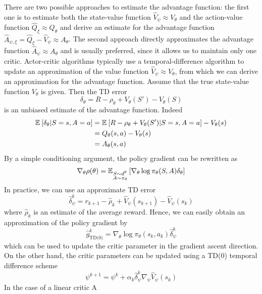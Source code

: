 There are two possible approaches to estimate the advantage function: the first one is to estimate both the state-value function $\widehat{V}_\psi \approx V_\theta$ and the action-value function $\widehat{Q}_\xi \approx Q_\theta$ and derive an estimate for the advantage function $\widehat{A}_{\psi, \xi} = \widehat{Q}_\xi - \widehat{V}_\psi \approx A_\theta$. The second approach directly approximates the advantage function $\widehat{A}_\psi \approx A_\theta$ and is usually preferred, since it allows us to maintain only one critic. Actor-critic algorithms typically use a temporal-difference algorithm to update an approximation of the value function $\widehat{V}_\psi \approx V_\theta$, from which we can derive an approximation for the advantage function. Assume that the true state-value function $V_\theta$ is given. Then the TD error 
\begin{equation}
	\delta_\theta = R - \rho_\theta + V_\theta(S') - V_\theta(S)
\end{equation}
is an unbiased estimate of the advantage function. Indeed 
\begin{equation*}
	\begin{split}
		\E{\delta_\theta | S = s, A = a} &= \E{R - \rho_\theta + V_\theta(S') | S = s, A = a} - V_\theta(s)\\
		&= Q_\theta(s,a) - V_\theta(s)\\
		&= A_\theta(s,a)  
	\end{split}
\end{equation*}
By a simple conditioning argument, the policy gradient can be rewritten as
\begin{equation}
	\nabla_\theta \rho(\theta) =
			\E[\substack{S \sim d^\theta\\A \sim \pi_\theta}]{\nabla_\theta\log
			\pi_\theta(S,A) \delta_\theta}
\end{equation} 
In practice, we can use an approximate TD error 
\begin{equation*}
	\widehat{\delta}_\psi^k = r_{k+1} - \widehat{\rho}_k + \widehat{V}_\psi(s_{k+1}) - \widehat{V}_\psi(s_k) 
\end{equation*}
where $\widehat{\rho}_k$ is an estimate of the average reward. Hence, we can easily obtain an approximation of the policy gradient by
\begin{equation*}
	\widehat{g}_\text{TD(0)}^k = \nabla_\theta\log \pi_\theta(s_k,a_k) \widehat{\delta}_\psi^k
\end{equation*}
which can be used to update the critic parameter in the gradient ascent direction. 
On the other hand, the critic parameters can be updated using a TD(0) temporal difference scheme
\begin{equation}
	\psi^{k+1} = \psi^k + \alpha_k \widehat{\delta}_\psi^k \nabla_\psi \widehat{V}_\psi(s_k)
\end{equation}
In the case of a linear critic A

